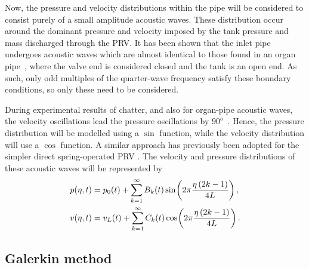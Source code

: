 Now, the pressure and velocity distributions within the pipe will be considered to consist purely of a small amplitude acoustic waves. These distribution occur around the dominant pressure and velocity imposed by the tank pressure and mass discharged through the PRV. It has been shown that the inlet pipe undergoes acoustic waves which are almost identical to those found in an organ pipe~\cite{Botros1997Riser-ReliefInteractions}, where the valve end is considered closed and the tank is an open end. As such, only odd multiples of the quarter-wave frequency satisfy these boundary conditions, so only these need to be considered.

During experimental results of chatter, and also for organ-pipe acoustic waves, the velocity oscillations lead the pressure oscillations by $90^o$~\cite{Hos2015DynamicModelling}. Hence, the pressure distribution will be modelled using a $\sin$ function, while the velocity distribution will use a $\cos$ function. A similar approach has previously been adopted for the simpler direct spring-operated PRV \cite{Hos2016DynamicService,Hos2015ModelPipe}. The velocity and pressure distributions of these acoustic waves will be represented by
~
\begin{equation} \label{eq: PressVelDist}
\begin{split}
    p(\eta,t) &= p_0(t) + \sum^{\infty}_{k=1} B_k(t) \, \fun{sin}{2\pi \frac{\eta \left( 2 k - 1 \right)}{4L}} \, ,\\
    v(\eta,t) &= v_L(t) + \sum_{k=1}^{\infty} C_k(t) \, \fun{cos}{2\pi \frac{\eta \left( 2 k - 1 \right)}{4L}} \, .
\end{split}
\end{equation}

\subsection{Galerkin method} \label{subsec: Galerkin}

